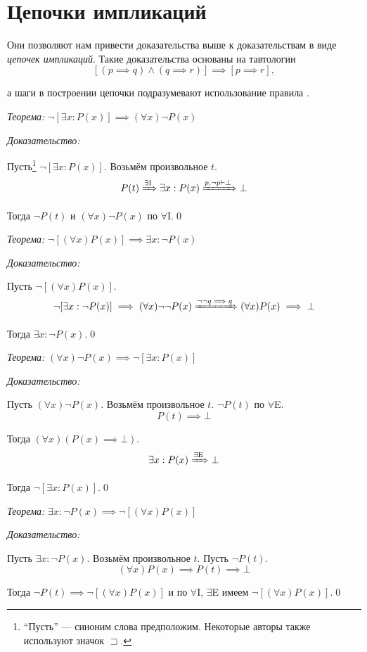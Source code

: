 \section{Цепочки импликаций}

Они позволяют нам привести доказательства выше к доказательствам в виде
{\it цепочек импликаций}. Такие доказательства основаны на тавтологии
\[
	[(p\implies q)\land(q\implies r)]\implies [p\implies r],
\]

а шаги в построении цепочки подразумевают использование правила \implic{}.

{\it Теорема:} $\lnot[\exists x:P(x)]\implies (\forall x)\lnot P(x)$

{\it Доказательство:}

Пусть\footnote{
	``Пусть'' --- синоним слова предположим. Некоторые авторы также
	используют значок $\sqsupset$.
} $\lnot[\exists x:P(x)]$. Возьмём произвольное $t$.
\[
	P(t)\xRightarrow{\text{$\exists$I}} \exists x:P(x)
	\xRightarrow{p,\lnot p\vdash\bot} \bot
\]

Тогда $\lnot P(t)$ и $(\forall x)\lnot P(x)$
по $\forall$I.\qed

{\it Теорема:} $\lnot[(\forall x)P(x)]\implies \exists x:\lnot P(x)$

{\it Доказательство:}

Пусть $\lnot[(\forall x)P(x)]$.
\[
	\lnot[\exists x:\lnot P(x)]\implies (\forall x)\lnot\lnot P(x)
	\xRightarrow{\lnot\lnot q\implies q} (\forall x)P(x)\implies\bot
\]

Тогда $\exists x:\lnot P(x)$.\qed

\pagebreak

{\it Теорема:} $(\forall x)\lnot P(x)\implies \lnot[\exists x:P(x)]$

{\it Доказательство:}

Пусть $(\forall x)\lnot P(x)$. Возьмём произвольное $t$. $\lnot P(t)$ по $\forall$E.
\[
	P(t)\implies \bot
\]

Тогда $(\forall x)(P(x)\implies \bot)$.
\[
	\exists x:P(x)\xRightarrow{\text{$\exists$E}} \bot
\]

Тогда $\lnot[\exists x:P(x)]$.\qed

{\it Теорема:} $\exists x:\lnot P(x)\implies\lnot[(\forall x)P(x)]$

{\it Доказательство:}

Пусть $\exists x:\lnot P(x)$. Возьмём произвольное $t$. Пусть $\lnot P(t)$.
\[
	(\forall x)P(x)\implies P(t)\implies \bot
\]

Тогда ${\lnot P(t)\implies \lnot[(\forall x)P(x)]}$ и по $\forall$I, $\exists$E
имеем $\lnot[(\forall x)P(x)]$.\qed

